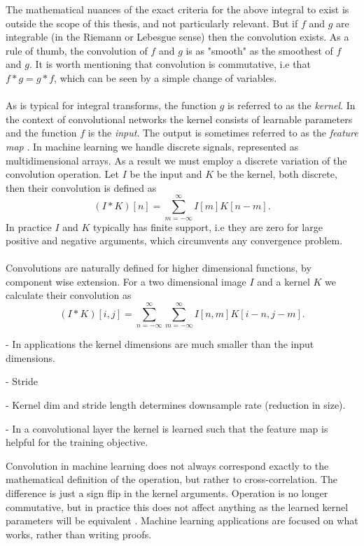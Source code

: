 \documentclass[../../thesis.tex]{subfiles}
\begin{document}
The mathematical nuances of the exact criteria for the above integral to exist is outside the scope of this thesis, and not particularly relevant. But if $f$ and $g$ are integrable (in the Riemann or Lebesgue sense) then the convolution exists. As a rule of thumb, the convolution of $f$ and $g$ is as "smooth" as the smoothest of $f$ and $g$. It is worth mentioning that convolution is commutative, i.e that $f*g = g*f$, which can be seen by a simple change of variables. 
\\\\ 
As is typical for integral transforms, the function $g$ is referred to as the \textit{kernel}. In the context of convolutional networks the kernel consists of learnable parameters and the function $f$ is the \textit{input}. The output is sometimes referred to as the \textit{feature map} \cite{deeplearningbook}. In machine learning we handle discrete signals, represented as multidimensional arrays. As a result we must employ a discrete variation of the convolution operation. Let $I$ be the input and $K$ be the kernel, both discrete, then their convolution is defined as
\begin{equation}
    (I*K)[n] = \sum_{m=-\infty}^{\infty} I[m]K[n-m].
\end{equation}
In practice $I$ and $K$ typically has finite support, i.e they are zero for large positive and negative arguments, which circumvents any convergence problem.\\\\
Convolutions are naturally defined for higher dimensional functions, by component wise extension. For a two dimensional image $I$ and a kernel $K$ we calculate their convolution as 
\begin{equation}
    (I*K)[i,j] = \sum_{n=-\infty}^{\infty}\sum_{m=-\infty}^{\infty} I[n,m]K[i - n,j - m]. 
\end{equation}


- In applications the kernel dimensions are much smaller than the input dimensions. 

- Stride 

- Kernel dim and stride length determines downsample rate (reduction in size). 

- In a convolutional layer the kernel is learned such that the feature map is helpful for the training objective. 


Convolution in machine learning does not always correspond exactly to the mathematical definition of the operation, but rather to cross-correlation. The difference is just a sign flip in the kernel arguments. Operation is no longer commutative, but in practice this does not affect anything as the learned kernel parameters will be equivalent \cite{deeplearningbook}. Machine learning applications are focused on what works, rather than writing proofs. \\\\
\end{document}
